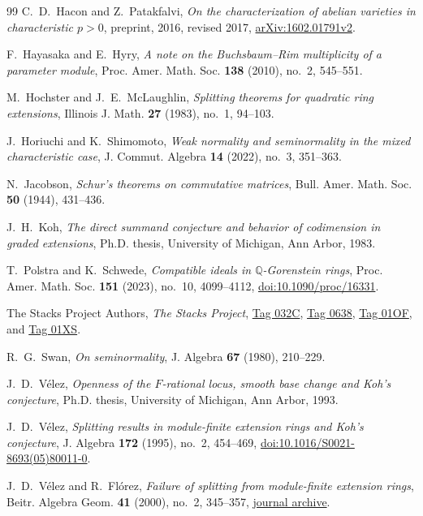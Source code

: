 \begin{thebibliography}{99}
C.~D.~Hacon and Z.~Patakfalvi,
\emph{On the characterization of abelian varieties in characteristic $p>0$},
preprint, 2016, revised 2017,
\href{https://arxiv.org/abs/1602.01791v2}{arXiv:1602.01791v2}.

F.~Hayasaka and E.~Hyry,
\emph{A note on the Buchsbaum--Rim multiplicity of a parameter module},
Proc. Amer. Math. Soc. \textbf{138} (2010), no.~2, 545--551.

M.~Hochster and J.~E.~McLaughlin,
\emph{Splitting theorems for quadratic ring extensions},
Illinois J. Math. \textbf{27} (1983), no.~1, 94--103.

J.~Horiuchi and K.~Shimomoto,
\emph{Weak normality and seminormality in the mixed characteristic case},
J. Commut. Algebra \textbf{14} (2022), no.~3, 351--363.

N.~Jacobson, \emph{Schur's theorems on commutative matrices},
Bull. Amer. Math. Soc. \textbf{50} (1944), 431--436.

J.~H.~Koh,
\emph{The direct summand conjecture and behavior of codimension in graded
extensions},
Ph.D. thesis, University of Michigan, Ann Arbor, 1983.

T.~Polstra and K.~Schwede,
\emph{Compatible ideals in $\mathbb Q$-Gorenstein rings},
Proc. Amer. Math. Soc. \textbf{151} (2023), no.~10, 4099--4112,
\href{https://doi.org/10.1090/proc/16331}{doi:10.1090/proc/16331}.

The Stacks Project Authors, \emph{The Stacks Project},
\href{https://stacks.math.columbia.edu/tag/032C}{Tag 032C},
\href{https://stacks.math.columbia.edu/tag/0638}{Tag 0638},
\href{https://stacks.math.columbia.edu/tag/01OF}{Tag 01OF}, and
\href{https://stacks.math.columbia.edu/tag/01XS}{Tag 01XS}.

R.~G.~Swan,
\emph{On seminormality},
J. Algebra \textbf{67} (1980), 210--229.

J.~D.~V\'elez,
\emph{Openness of the $F$-rational locus, smooth base change and Koh's conjecture},
Ph.D. thesis, University of Michigan, Ann Arbor, 1993.

J.~D.~V\'elez,
\emph{Splitting results in module-finite extension rings and Koh's conjecture},
J. Algebra \textbf{172} (1995), no.~2, 454--469,
\href{https://doi.org/10.1016/S0021-8693(05)80011-0}{doi:10.1016/S0021-8693(05)80011-0}.

J.~D.~V\'elez and R.~Fl\'orez,
\emph{Failure of splitting from module-finite extension rings},
Beitr. Algebra Geom. \textbf{41} (2000), no.~2, 345--357,
\href{https://www.maths.tcd.ie/EMIS/journals/BAG/vol.41/no.2/5.html}{journal archive}.


\end{thebibliography}
